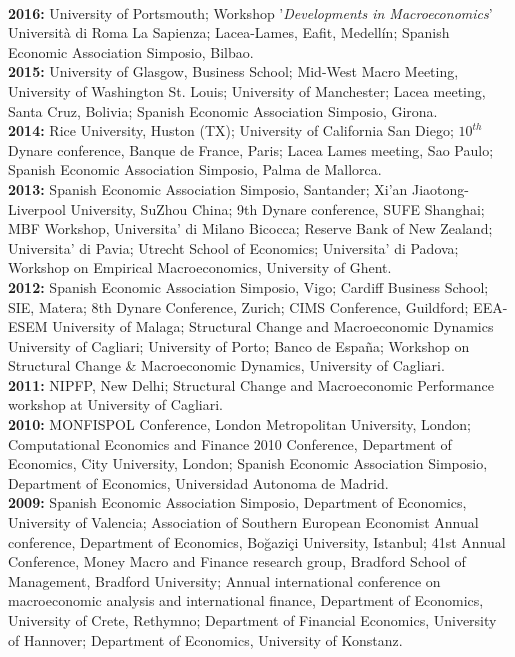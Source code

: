 \documentclass[10p]{article}
\begin{document}
\\
\textbf{2016:} {University of Portsmouth; Workshop '\emph{Developments in Macroeconomics}' Universit\`{a} di Roma La Sapienza; Lacea-Lames, Eafit, Medell\'{i}n; Spanish Economic Association Simposio, Bilbao.} 
\\
\textbf{2015:} {University of Glasgow, Business School; Mid-West Macro Meeting, University of Washington St. Louis; University of Manchester; Lacea meeting, Santa Cruz, Bolivia; Spanish Economic Association Simposio, Girona.} 
\\
\textbf{2014:} {Rice University, Huston (TX); University of California San Diego; $10^{th}$ Dynare conference, Banque de France, Paris; Lacea Lames meeting, Sao Paulo; Spanish Economic Association Simposio, Palma de Mallorca.} 
\\
\textbf{2013:} {Spanish Economic Association Simposio, Santander; Xi'an Jiaotong-Liverpool University, SuZhou China; 9th Dynare conference, SUFE Shanghai; MBF Workshop, Universita' di Milano Bicocca; Reserve Bank of New Zealand; Universita' di Pavia; Utrecht School of Economics; Universita' di Padova; Workshop on Empirical Macroeconomics, University of Ghent.}
\\
\textbf{2012:} {Spanish Economic Association Simposio, Vigo; Cardiff Business School; SIE, Matera; 8th Dynare Conference, Zurich; CIMS Conference, Guildford; EEA-ESEM University of Malaga; Structural Change and Macroeconomic Dynamics University of Cagliari; University of Porto; Banco de Espa\~{n}a; Workshop on Structural Change \& Macroeconomic Dynamics, University of Cagliari.}
\\
\textbf{2011:} {NIPFP, New Delhi; Structural Change and Macroeconomic Performance workshop at University of 
Cagliari.}
\\
\textbf{2010:} {MONFISPOL Conference, London Metropolitan University, London; Computational Economics and Finance 2010 Conference, Department of Economics,  City University, London; Spanish Economic Association Simposio, Department of Economics,  Universidad Autonoma de Madrid. }
\\
\textbf{2009:} {Spanish Economic Association Simposio, Department of Economics,  University of Valencia; Association of Southern European Economist Annual conference, Department of Economics, Bo\u{g}azi\c{c}i University, Istanbul; 41st Annual Conference, Money Macro and Finance research group, Bradford School of Management, Bradford University; Annual international conference on macroeconomic analysis and international finance, Department of Economics, University of Crete, Rethymno; Department of Financial Economics, University of Hannover; Department of Economics, University of Konstanz.}
\end{document}
